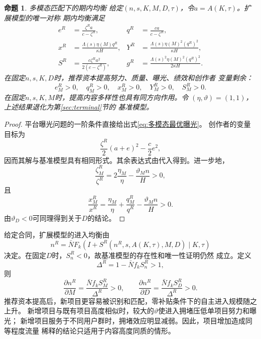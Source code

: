 \documentclass[UTF8, a4paper, 12pt, fontset=fandol]{ctexart}
\newtheorem{proposition}[theorem]{命题}
\theoremstyle{definition}
\theoremstyle{remark}
\begin{document}
\begin{proposition}{多模态匹配下的期内均衡}
  \label{prop:多模态期内均衡}
  给定$(n,s,K,M,D,\tau)$，令$a=A(K,\tau)$。扩展模型的唯一对称
  期内均衡满足
  \begin{align}
    e^R&=\frac{\zeta^R a}{c-\zeta^R},
    &q^R&=\frac{ca}{c-\zeta^R},\label{eq:多模态努力质量}\\
    x^R&=\frac{\Lambda(s)\eta(M)q^R}{\kappa H},
    &Y^R&=\frac{\Lambda(s)\eta(M)^2(q^R)^2}{\kappa H},
    \label{eq:多模态曝光绩效}\\
    S^R&=\frac{c\zeta^R a^2}{2(c-\zeta^R)},
    &g^R&=\frac{\Lambda(s)^2\eta(M)^2(q^R)^2}{2\kappa H}.
    \label{eq:多模态剩余利润}
  \end{align}
  在固定$n,s,K,D$时，推荐资本提高努力、质量、曝光、绩效和创作者
  变量剩余：
  \begin{equation*}
    e_M^R>0,\quad q_M^R>0,\quad x_M^R>0,
    \quad Y_M^R>0,\quad S_M^R>0.
  \end{equation*}
  在固定$n,s,K,M$时，提高内容多样性也具有同方向作用。令
  $(\eta,\vartheta)=(1,1)$，上述结果退化为第\ref{sec:terminal}节的
  基准模型。
\end{proposition}

\begin{proof}
  平台曝光问题的一阶条件直接给出式\eqref{eq:多模态最优曝光}。
  创作者的变量目标为
  \begin{equation*}
    \frac{\zeta^R}{2}(a+e)^2-\frac c2e^2,
  \end{equation*}
  因而其解与基准模型具有相同形式。其余表达式由代入得到。进一步地，
  \begin{equation*}
    \frac{\zeta_M^R}{\zeta^R}
    =2\frac{\eta_M}{\eta}
    -\frac{\vartheta_M n}{H}>0,
  \end{equation*}
  且
  \begin{equation*}
    \frac{x_M^R}{x^R}
    =\frac{\eta_M}{\eta}
    +\frac{q_M^R}{q^R}
    -\frac{\vartheta_M n}{H}>0.
  \end{equation*}
  由$\vartheta_D<0$可同理得到关于$D$的结论。
\end{proof}

给定合同，扩展模型的进入均衡由
\begin{equation}
  n^R
  =\bar N F_k\left(
    I+S^R(n^R,s,A(K,\tau),M,D)
    \mid K,\tau
  \right)
  \label{eq:多模态进入固定点}
\end{equation}
决定。在固定$D$时，$S_n^R<0$，故基准模型的存在性和唯一性证明仍然
成立。定义
\begin{equation*}
  \Delta^R
  =1-\bar N f_k S_n^R>1,
\end{equation*}
则
\begin{equation}
  \frac{\partial n^R}{\partial M}
  =\frac{\bar Nf_kS_M^R}{\Delta^R}>0,
  \qquad
  \frac{\partial n^R}{\partial D}
  =\frac{\bar Nf_kS_D^R}{\Delta^R}>0.
  \label{eq:推荐资本与多样性进入}
\end{equation}
推荐资本提高后，新项目更容易被识别和匹配，零补贴条件下的自主进入规模随之上升。
新增项目与既有项目高度相似时，较大的$\vartheta$使进入拥堵压低单项目努力和曝光；
新增项目服务于不同用户群时，拥堵效应明显减弱。因此，项目增加造成同等程度流量
稀释的结论只适用于内容高度同质的情形。
\end{document}
